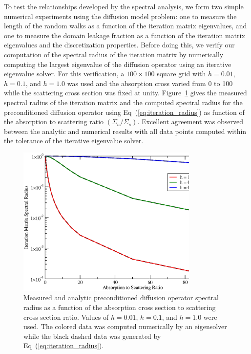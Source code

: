 \documentclass[preprint,11pt]{elsarticle}
\begin{document}
To test the relationships developed by the spectral analysis, we form two
simple numerical experiments using the diffusion model problem: one to measure
the length of the random walks as a function of the iteration matrix
eigenvalues, and one to measure the domain leakage fraction as a function of
the iteration matrix eigenvalues and the discretization properties. Before
doing this, we verify our computation of the spectral radius of the iteration
matrix by numerically computing the largest eigenvalue of the diffusion
operator using an iterative eigenvalue solver. For this verification, a $100
\times 100$ square grid with $h=0.01$, $h=0.1$, and $h=1.0$ was used and the
absorption cross varied from 0 to 100 while the scattering cross section was
fixed at unity. Figure~\ref{fig:measured_spec_rad} gives the measured spectral
radius of the iteration matrix and the computed spectral radius for the
preconditioned diffusion operator using Eq~(\ref{eq:iteration_radius}) as
function of the absorption to scattering ratio $(\Sigma_a /
\Sigma_s)$. Excellent agreement was observed between the analytic and
numerical results with all data points computed within the tolerance of the
iterative eigenvalue solver.
\begin{figure}[ht!]
  \begin{center}
    \includegraphics[width=0.8\textwidth]{spec_rad_results.eps}
  \end{center}
  \caption{Measured and analytic preconditioned diffusion operator
    spectral radius as a function of the absorption cross section to
    scattering cross section ratio. Values of $h=0.01$, $h=0.1$, and
    $h=1.0$ were used. The colored data was computed numerically by an
    eigensolver while the black dashed data was generated by
    Eq~(\ref{eq:iteration_radius}).}
  \label{fig:measured_spec_rad}
\end{figure}
\end{document}
